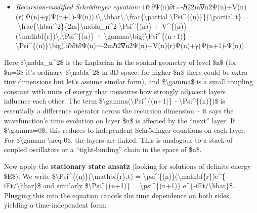\documentclass[
]{article}
\begin{document}
\begin{itemize}
\item
  \emph{Recursion-modified Schrödinger equation:}
  i ℏ ∂Ψ(n)∂t=-ℏ22m∇n2Ψ(n)+V(n)(r) Ψ(n)+γ(Ψ(n+1)-Ψ(n)).i\textbackslash,\textbackslash hbar\textbackslash,\textbackslash frac\{\textbackslash partial
  \textbackslash Psi\^{}\{(n)\}\}\{\textbackslash partial t\} =
  -\textbackslash frac\{\textbackslash hbar\^{}2\}\{2m\}\textbackslash nabla\_n\^{}2
  \textbackslash Psi\^{}\{(n)\} +
  V\^{}\{(n)\}(\textbackslash mathbf\{r\})\textbackslash,\textbackslash Psi\^{}\{(n)\}
  +
  \textbackslash gamma\textbackslash big(\textbackslash Psi\^{}\{(n+1)\}
  -
  \textbackslash Psi\^{}\{(n)\}\textbackslash big).iℏ∂t∂Ψ(n)\hspace{0pt}=-2mℏ2\hspace{0pt}∇n2\hspace{0pt}Ψ(n)+V(n)(r)Ψ(n)+γ(Ψ(n+1)-Ψ(n)).
\end{itemize}

Here \$\textbackslash nabla\_n\^{}2\$ is the Laplacian in the spatial
geometry of level \$n\$ (for \$n=3\$ it's ordinary
\$\textbackslash nabla\^{}2\$ in 3D space; for higher \$n\$ there could
be extra tiny dimensions but let's assume similar form), and
\$\textbackslash gamma\$ is a small coupling constant with units of
energy that measures how strongly adjacent layers influence each
other\hspace{0pt}. The term
\$\textbackslash gamma(\textbackslash Psi\^{}\{(n+1)\} -
\textbackslash Psi\^{}\{(n)\})\$ is essentially a difference operator
across the recursion dimension -- it says the wavefunction's time
evolution on layer \$n\$ is affected by the ``next'' layer. If
\$\textbackslash gamma=0\$, this reduces to independent Schrödinger
equations on each layer. For \$\textbackslash gamma \textbackslash neq
0\$, the layers are linked. This is analogous to a stack of coupled
oscillators or a ``tight-binding'' chain in the space of
\$n\$\hspace{0pt}.

Now apply the \textbf{stationary state ansatz} (looking for solutions of
definite energy \$E\$). We write
\$\textbackslash Psi\^{}\{(n)\}(\textbackslash mathbf\{r\},t) =
\textbackslash psi\^{}\{(n)\}(\textbackslash mathbf\{r\})e\^{}\{-iEt/\textbackslash hbar\}\$
and similarly \$\textbackslash Psi\^{}\{(n+1)\} =
\textbackslash psi\^{}\{(n+1)\}
e\^{}\{-iEt/\textbackslash hbar\}\$\hspace{0pt}. Plugging this into the
equation cancels the time dependence on both sides, yielding a
time-independent form:
\end{document}
